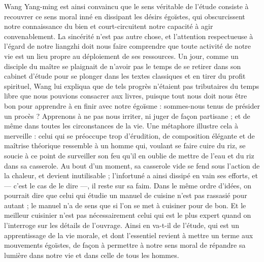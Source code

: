 \documentclass[11pt,a4paper]{article} %
\begin{document}
Wang Yang-ming est ainsi convaincu que le sens véritable de l'étude consiste à recouvrer ce sens moral inné en dissipant les désirs égoïstes, qui obscurcissent notre
connaissance du bien et court-circuitent notre capacité à agir convenablement.
La sincérité n'est pas autre chose, et l'attention respectueuse à l'égard de notre liangzhi
doit nous faire comprendre que toute activité de notre vie est un lieu propre au déploiement de ses ressources.
Un jour, comme un disciple du maître se plaignait de n'avoir
pas le temps de se retirer dans son cabinet d'étude pour se plonger dans les textes classiques et en tirer du profit spirituel, Wang lui expliqua que de tels progrès n'étaient pas
tributaires du temps libre que nous pouvions consacrer aux livres, puisque tout nous doit
nous être bon pour apprendre à en finir avec notre égoïsme : sommes-nous tenus de présider un procès ? Apprenons à ne pas nous irriter, ni juger de façon partisane ; et de
même dans toutes les circonstances de la vie.
Une métaphore illustre cela à merveille :
celui qui se préoccupe trop d'érudition, de composition élégante et de maîtrise théorique
ressemble à un homme qui, voulant se faire cuire du riz, se soucie à ce point de surveiller son feu qu'il en oublie de mettre de l'eau et du riz dans sa casserole.
Au bout d'un
moment, sa casserole vide se fend sous l'action de la chaleur, et devient inutilisable ;
l'infortuné a ainsi dissipé en vain ses efforts, et --- c'est le cas de le dire ---, il reste sur sa
faim.
Dans le même ordre d'idées, on pourrait dire que celui qui étudie un manuel de
cuisine n'est pas rassasié pour autant ; le manuel n'a de sens que si l'on se met à cuisiner pour de bon.
Et le meilleur cuisinier n'est pas nécessairement celui qui est le plus
expert quand on l'interroge sur les détails de l'ouvrage.
Ainsi en va-t-il de l'étude,
qui est un apprentissage de la vie morale, et dont l'essentiel revient à mettre un terme
aux mouvements égoïstes, de façon à permettre à notre sens moral de répandre sa lumière dans notre vie et dans celle de tous les hommes.
\end{document}
